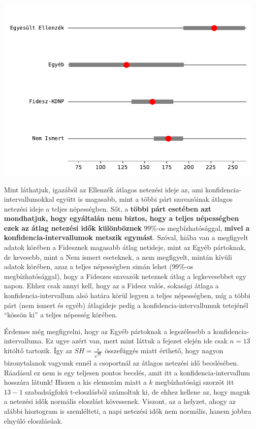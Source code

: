 \documentclass[
]{book}
\begin{document}
\includegraphics{_main_files/figure-latex/unnamed-chunk-282-11.pdf}

Mint láthatjuk, igazából az Ellenzék átlagos netezési ideje az, ami konfidencia-intervallumokkal együtt is magasabb, mint a többi párt szavazóinak átlagos netezési ideje a teljes népességben. Sőt, a \textbf{többi párt esetében azt mondhatjuk, hogy egyáltalán nem biztos, hogy a teljes népességben ezek az átlag netezési idők különböznek} \(99\%\)-os megbízhatósággal, \textbf{mivel a konfidencia-intervallumok metszik egymást}. Szóval, hiába van a megfigyelt adatok körében a Fidesznek magasabb átlag netideje, mint az Egyéb pártoknak, de kevesebb, mint a Nem ismert eseteknek, a nem megfigyelt, mintán kívüli adatok körében, azaz a teljes népességben simán lehet (\(99\%\)-os megbízhatósággal), hogy a Fideszes szavazók neteznek átlag a legkevesebbet egy napon. Ehhez csak annyi kell, hogy az a Fidesz valós, sokasági átlaga a konfidencia-intervallum alsó határa körül legyen a teljes népességben, míg a többi párt (nem ismert és egyéb) átlagideje pedig a konfidencia-intervallumuk tetejénél ``kössön ki'' a teljes népesség körében.

Érdemes még megfigyelni, hogy az Egyéb pártoknak a legszélesebb a konfidencia-intervalluma. Ez ugye azért van, mert mint láttuk a fejezet elején ide csak \(n=13\) kitöltő tartozik. Így az \(SH=\frac{s}{\sqrt{n}}\) összefüggés miatt érthető, hogy nagyon bizonytalanok vagyunk ennél a csoportnál az átlagos netezési idő becslésében. Ráadásul ez nem is egy teljesen pontos becslés, amit itt a konfidencia-intervallum hosszára látunk! Hiszen a kis elemszám miatt a \(k\) megbízhatósági szorzót itt \(13-1\) szabadságfokú t-eloszlásból számoltuk ki, de ehhez kellene az, hogy maguk a netezési idők normális eloszlást kövessenek. Viszont, az a helyzet, ahogy az alábbi hisztogram is szemlélteti, a napi netezési idők nem normális, hanem jobbra elnyúló eloszlásúak.
\end{document}
